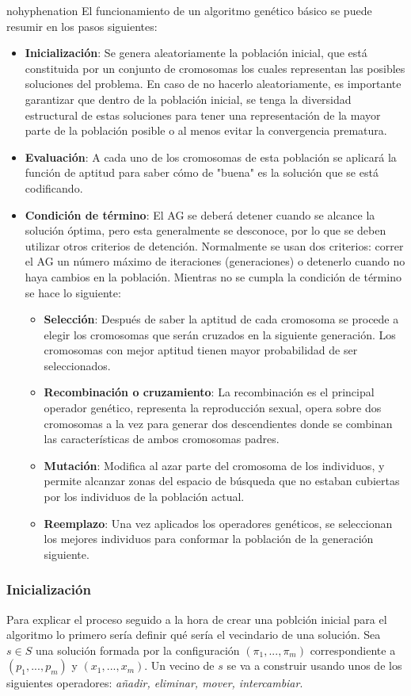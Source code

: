 \documentclass[a4paper,10pt,twocolumn]{article}
\begin{document}
\begin{hyphenrules}{nohyphenation}
El funcionamiento de un algoritmo genético básico se puede resumir en los pasos siguientes:
\begin{itemize}
	\item \textbf{Inicialización}: Se genera aleatoriamente la población inicial, que está constituida por un conjunto de cromosomas los cuales representan las posibles soluciones del problema. En caso de no hacerlo aleatoriamente, es importante garantizar que dentro de la población inicial, se tenga la diversidad estructural de estas soluciones para tener una representación de la mayor parte de la población posible o al menos evitar la convergencia prematura.
	\item \textbf{Evaluación}: A cada uno de los cromosomas de esta población se aplicará la función de aptitud para saber cómo de "buena" es la solución que se está codificando.
	\item \textbf{Condición de término}: El AG se deberá detener cuando se alcance la solución óptima, pero esta generalmente se desconoce, por lo que se deben utilizar otros criterios de detención. Normalmente se usan dos criterios: correr el AG un número máximo de iteraciones (generaciones) o detenerlo cuando no haya cambios en la población. Mientras no se cumpla la condición de término se hace lo siguiente:
	\begin{itemize}
		\item \textbf{Selección}: Después de saber la aptitud de cada cromosoma se procede a elegir los cromosomas que serán cruzados en la siguiente generación. Los cromosomas con mejor aptitud tienen mayor probabilidad de ser seleccionados.
		\item \textbf{Recombinación o cruzamiento}: La recombinación es el principal operador genético, representa la reproducción sexual, opera sobre dos cromosomas a la vez para generar dos descendientes donde se combinan las características de ambos cromosomas padres.
		\item \textbf{Mutación}: Modifica al azar parte del cromosoma de los individuos, y permite alcanzar zonas del espacio de búsqueda que no estaban cubiertas por los individuos de la población actual.
		\item \textbf{Reemplazo}: Una vez aplicados los operadores genéticos, se seleccionan los mejores individuos para conformar la población de la generación siguiente. \cite{5}
	\end{itemize}
\end{itemize}

\subsubsection{Inicialización}\label{init}
Para explicar el proceso seguido a la hora de crear una poblción inicial para el algoritmo lo primero sería definir qué sería el vecindario de una solución. Sea $s \in S$ una solución formada por la configuración $(\pi_1,...,\pi_m)$ correspondiente a $(p_1,...,p_m)$ y $(x_1,...,x_m)$. Un vecino de $s$ se va a construir usando unos de los siguientes operadores: \textit{añadir, eliminar, mover, intercambiar}. 


\end{hyphenrules}
\end{document}
